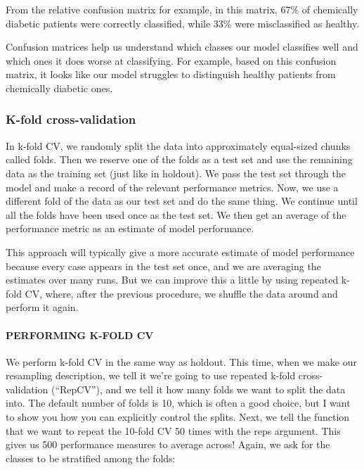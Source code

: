 \documentclass[
]{article}
\begin{document}
From the relative confusion matrix for example, in this matrix, 67\% of
chemically diabetic patients were correctly classified, while 33\% were
misclassified as healthy.

Confusion matrices help us understand which classes our model classifies
well and which ones it does worse at classifying. For example, based on
this confusion matrix, it looks like our model struggles to distinguish
healthy patients from chemically diabetic ones.

\subsubsection{K-fold cross-validation}\label{k-fold-cross-validation}

In k-fold CV, we randomly split the data into approximately equal-sized
chunks called folds. Then we reserve one of the folds as a test set and
use the remaining data as the training set (just like in holdout). We
pass the test set through the model and make a record of the relevant
performance metrics. Now, we use a different fold of the data as our
test set and do the same thing. We continue until all the folds have
been used once as the test set. We then get an average of the
performance metric as an estimate of model performance.

This approach will typically give a more accurate estimate of model
performance because every case appears in the test set once, and we are
averaging the estimates over many runs. But we can improve this a little
by using repeated k-fold CV, where, after the previous procedure, we
shuffle the data around and perform it again.

\paragraph{PERFORMING K-FOLD CV}\label{performing-k-fold-cv}

We perform k-fold CV in the same way as holdout. This time, when we make
our resampling description, we tell it we're going to use repeated
k-fold cross-validation (``RepCV''), and we tell it how many folds we
want to split the data into. The default number of folds is 10, which is
often a good choice, but I want to show you how you can explicitly
control the splits. Next, we tell the function that we want to repeat
the 10-fold CV 50 times with the reps argument. This gives us 500
performance measures to average across! Again, we ask for the classes to
be stratified among the folds:
\end{document}
